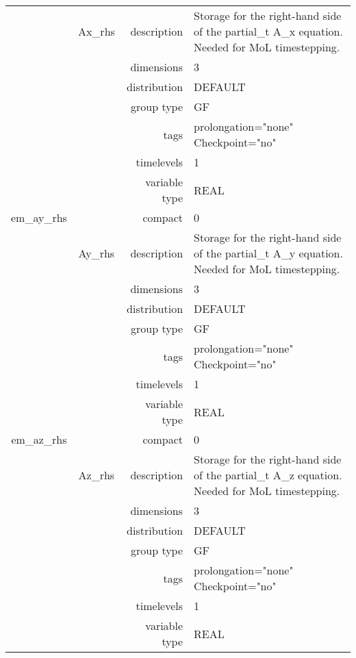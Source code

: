 \begin{tabular*}{150mm}{|c|c@{\extracolsep{\fill}}|rl|}
 & Ax\_rhs & description & Storage for the right-hand side of the partial\_t A\_x equation. Needed for MoL timestepping. \\ 
 &  & dimensions & 3 \\ 
 &  & distribution & DEFAULT \\ 
 &  & group type & GF \\ 
 &  & tags & prolongation="none" Checkpoint="no" \\ 
 &  & timelevels & 1 \\ 
 &  & variable type & REAL \\ 
\hline 
em\_ay\_rhs &  & compact & 0 \\ 
 & Ay\_rhs & description & Storage for the right-hand side of the partial\_t A\_y equation. Needed for MoL timestepping. \\ 
 &  & dimensions & 3 \\ 
 &  & distribution & DEFAULT \\ 
 &  & group type & GF \\ 
 &  & tags & prolongation="none" Checkpoint="no" \\ 
 &  & timelevels & 1 \\ 
 &  & variable type & REAL \\ 
\hline 
em\_az\_rhs &  & compact & 0 \\ 
 & Az\_rhs & description & Storage for the right-hand side of the partial\_t A\_z equation. Needed for MoL timestepping. \\ 
 &  & dimensions & 3 \\ 
 &  & distribution & DEFAULT \\ 
 &  & group type & GF \\ 
 &  & tags & prolongation="none" Checkpoint="no" \\ 
 &  & timelevels & 1 \\ 
 &  & variable type & REAL \\ 
\hline 
\end{tabular*} 



\vspace{5mm}
\vspace{5mm}

